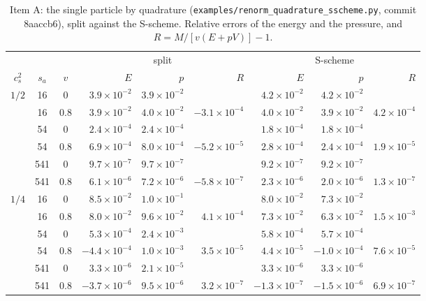 \documentclass[11pt,aps,preprint,nofootinbib,superscriptaddress,tightenlines]{revtex4-2}
\begin{document}
\begin{table}[h]
\caption{Item A: the single particle by quadrature (\nolinkurl{examples/renorm_quadrature_sscheme.py}, commit 8aaccb6), split against the
S-scheme.  Relative errors of the energy and the pressure, and $R=M/[v(E+pV)]-1$.}
\label{tab:A}
\small
\begin{tabular}{cccrrrrrr}
\toprule
 & & & \multicolumn{3}{c}{split} & \multicolumn{3}{c}{S-scheme} \\
$c_s^2$ & $s_a$ & $v$ & $E$ & $p$ & $R$ & $E$ & $p$ & $R$ \\
\midrule
$1/2$ & 16 & 0 & $3.9\times10^{-2}$ & $3.9\times10^{-2}$ & & $4.2\times10^{-2}$ & $4.2\times10^{-2}$ & \\
 & 16 & 0.8 & $3.9\times10^{-2}$ & $4.0\times10^{-2}$ & $-3.1\times10^{-4}$ & $4.0\times10^{-2}$ & $3.9\times10^{-2}$ & $4.2\times10^{-4}$ \\
 & 54 & 0 & $2.4\times10^{-4}$ & $2.4\times10^{-4}$ & & $1.8\times10^{-4}$ & $1.8\times10^{-4}$ & \\
 & 54 & 0.8 & $6.9\times10^{-4}$ & $8.0\times10^{-4}$ & $-5.2\times10^{-5}$ & $2.8\times10^{-4}$ & $2.4\times10^{-4}$ & $1.9\times10^{-5}$ \\
 & 541 & 0 & $9.7\times10^{-7}$ & $9.7\times10^{-7}$ & & $9.2\times10^{-7}$ & $9.2\times10^{-7}$ & \\
 & 541 & 0.8 & $6.1\times10^{-6}$ & $7.2\times10^{-6}$ & $-5.8\times10^{-7}$ & $2.3\times10^{-6}$ & $2.0\times10^{-6}$ & $1.3\times10^{-7}$ \\
$1/4$ & 16 & 0 & $8.5\times10^{-2}$ & $1.0\times10^{-1}$ & & $8.0\times10^{-2}$ & $7.3\times10^{-2}$ & \\
 & 16 & 0.8 & $8.0\times10^{-2}$ & $9.6\times10^{-2}$ & $4.1\times10^{-4}$ & $7.3\times10^{-2}$ & $6.3\times10^{-2}$ & $1.5\times10^{-3}$ \\
 & 54 & 0 & $5.3\times10^{-4}$ & $2.4\times10^{-3}$ & & $5.8\times10^{-4}$ & $5.7\times10^{-4}$ & \\
 & 54 & 0.8 & $-4.4\times10^{-4}$ & $1.0\times10^{-3}$ & $3.5\times10^{-5}$ & $4.4\times10^{-5}$ & $-1.0\times10^{-4}$ & $7.6\times10^{-5}$ \\
 & 541 & 0 & $3.3\times10^{-6}$ & $2.1\times10^{-5}$ & & $3.3\times10^{-6}$ & $3.3\times10^{-6}$ & \\
 & 541 & 0.8 & $-3.7\times10^{-6}$ & $9.5\times10^{-6}$ & $3.2\times10^{-7}$ & $-1.3\times10^{-7}$ & $-1.5\times10^{-6}$ & $6.9\times10^{-7}$ \\
\bottomrule
\end{tabular}
\end{table}
\end{document}
